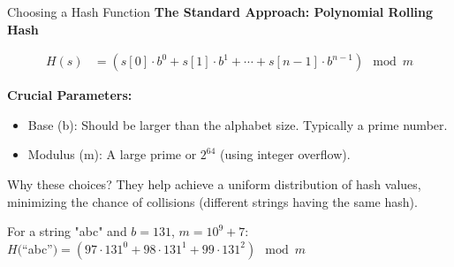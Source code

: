 \documentclass{beamer}
\begin{document}
\begin{frame}{Choosing a Hash Function}
    \textbf{The Standard Approach: Polynomial Rolling Hash}
    \vspace{-20pt}

    \begin{align*}
        H(s) &= \left(s[0] \cdot b^{0} + s[1] \cdot b^{1} + \cdots + s[n-1] \cdot b^{n-1}\right) \mod m
    \end{align*}

    \textbf{Crucial Parameters:}
    \begin{itemize}
        \item \alert{Base (b):} Should be \alert{larger than the alphabet size}. Typically a \alert{prime number}.
        \item \alert{Modulus (m):} A \alert{large prime} or \alert{$2^{64}$} (using integer overflow).
    \end{itemize}

    \begin{block}{Why these choices?}
        They help achieve a \alert{uniform distribution} of hash values, minimizing the chance of \alert{collisions} (different strings having the same hash).
    \end{block}

    \begin{example}
        For a string "abc" and $b=131$, $m=10^9+7$:\\
        $H($``abc''$) = (97 \cdot 131^0 + 98 \cdot 131^1 + 99 \cdot 131^2) \mod m$
    \end{example}
\end{frame}
\end{document}
